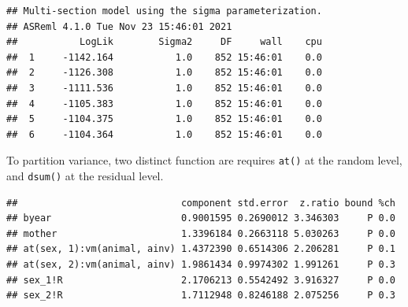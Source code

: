 \documentclass[
  12pt,
]{book}
\newenvironment{Shaded}{\begin{snugshade}}{\end{snugshade}}
\newcommand{\DataTypeTok}[1]{\textcolor[rgb]{0.13,0.29,0.53}{#1}}
\newcommand{\DecValTok}[1]{\textcolor[rgb]{0.00,0.00,0.81}{#1}}
\newcommand{\KeywordTok}[1]{\textcolor[rgb]{0.13,0.29,0.53}{\textbf{#1}}}
\newcommand{\NormalTok}[1]{#1}
\newcommand{\OperatorTok}[1]{\textcolor[rgb]{0.81,0.36,0.00}{\textbf{#1}}}
\newcommand{\StringTok}[1]{\textcolor[rgb]{0.31,0.60,0.02}{#1}}
\begin{document}
\begin{Shaded}
\end{Shaded}

\begin{verbatim}
## Multi-section model using the sigma parameterization.
## ASReml 4.1.0 Tue Nov 23 15:46:01 2021
##           LogLik        Sigma2     DF     wall    cpu
##  1     -1142.164           1.0    852 15:46:01    0.0
##  2     -1126.308           1.0    852 15:46:01    0.0
##  3     -1111.536           1.0    852 15:46:01    0.0
##  4     -1105.383           1.0    852 15:46:01    0.0
##  5     -1104.375           1.0    852 15:46:01    0.0
##  6     -1104.364           1.0    852 15:46:01    0.0
\end{verbatim}

To partition variance, two distinct function are requires \texttt{at()} at the random level, and \texttt{dsum()} at the residual level.

\begin{Shaded}
\end{Shaded}

\begin{verbatim}
##                             component std.error  z.ratio bound %ch
## byear                       0.9001595 0.2690012 3.346303     P 0.0
## mother                      1.3396184 0.2663118 5.030263     P 0.0
## at(sex, 1):vm(animal, ainv) 1.4372390 0.6514306 2.206281     P 0.1
## at(sex, 2):vm(animal, ainv) 1.9861434 0.9974302 1.991261     P 0.3
## sex_1!R                     2.1706213 0.5542492 3.916327     P 0.0
## sex_2!R                     1.7112948 0.8246188 2.075256     P 0.3
\end{verbatim}
\end{document}
